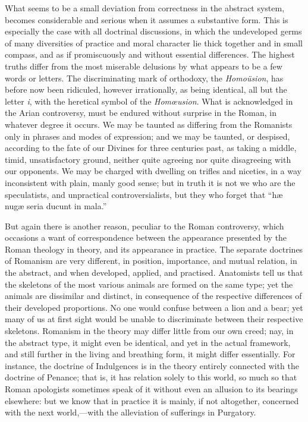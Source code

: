 What seems to be a small deviation from
correctness in the abstract system, becomes considerable and serious
when it assumes a substantive form. This is especially the case with
all doctrinal discussions, in which the undeveloped germs of many
diversities of practice and moral character lie thick together and in
small compass, and as if promiscuously and without essential
differences. The highest truths differ from the most miserable
delusions by what appears to be a few words or letters. The
discriminating mark of orthodoxy, the \emph{Homoüsion}, has before
now been ridiculed, however irrationally, as being identical, all but
the letter \emph{i}, with the heretical symbol of the \emph{Homœusion}.
What is acknowledged in the Arian controversy, must be endured without
surprise in the Roman, in whatever degree it occurs. We may be taunted
as differing from the Romanists only in phrases and modes of
expression; and we may be taunted, or despised, according to the fate
of our Divines for three centuries past, as taking a middle, timid,
unsatisfactory ground, neither quite agreeing nor quite disagreeing
with our opponents. We may be charged with dwelling on trifles and
niceties, in a way inconsistent with plain, manly good sense; but in
truth it is not we who are the speculatists, and unpractical
controversialists, but they who forget that ``hæ nugæ seria ducunt in
mala.''

But again there is another reason, peculiar to
the Roman controversy, which occasions a want of correspondence
between the appearance presented by the Roman theology in theory, and
its appearance in practice. The separate doctrines of Romanism
are very different, in position, importance, and mutual relation, in
the abstract, and when developed, applied, and practised. Anatomists
tell us that the skeletons of the most various animals are formed on
the same type; yet the animals are dissimilar and distinct, in
consequence of the respective differences of their developed
proportions. No one would confuse between a lion and a bear; yet many
of us at first sight would be unable to discriminate between their
respective skeletons. Romanism in the theory may differ little from
our own creed; nay, in the abstract type, it might even be identical,
and yet in the actual framework, and still further in the living and
breathing form, it might differ essentially. For instance, the
doctrine of Indulgences is in the theory entirely connected with the
doctrine of Penance; that is, it has relation solely to this world, so
much so that Roman apologists sometimes speak of it without even an
allusion to its bearings elsewhere: but we know that in practice it is
mainly, if not altogether, concerned with the next world,—with the
alleviation of sufferings in Purgatory.

